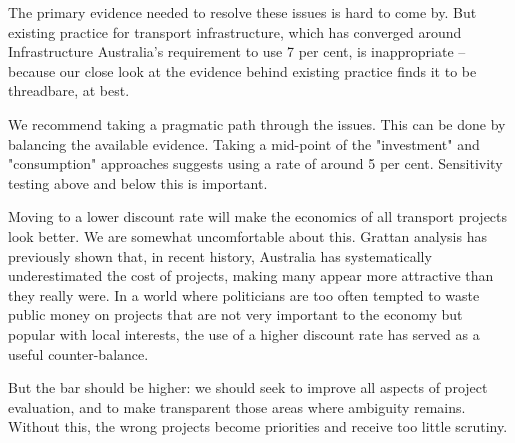 \begin{overview}
The primary evidence needed to resolve these issues is hard to come by. But existing practice for transport infrastructure, which has converged around Infrastructure Australia’s requirement to use 7 per cent, is inappropriate -- because our close look at the evidence behind existing practice finds it to be threadbare, at best.

We recommend taking a pragmatic path through the issues. This can be done by balancing the available evidence. Taking a mid-point of the "investment" and "consumption" approaches suggests using a rate of around 5 per cent. Sensitivity testing above and below this is important.  

Moving to a lower discount rate will make the economics of all transport projects look better. We are somewhat uncomfortable about this. Grattan analysis has previously shown that, in recent history, Australia has systematically underestimated the cost of projects, making many appear more attractive than they really were. In a world where politicians are too often tempted to waste public money on projects that are not very important to the economy but popular with local interests, the use of a higher discount rate has served as a useful counter-balance. 

But the bar should be higher: we should seek to improve all aspects of project evaluation, and to make transparent those areas where ambiguity remains. Without this, the wrong projects become priorities and receive too little scrutiny. 

\end{overview}